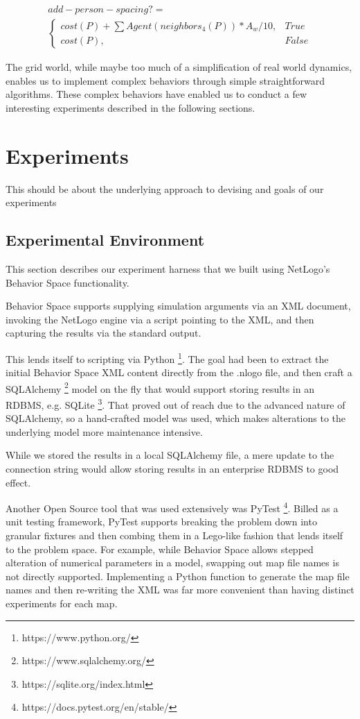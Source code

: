 \documentclass[12pt,letterpaper]{article}
\begin{document}
\begin{align}
add-person-spacing?= \nonumber  \\
\begin{cases}
	cost(P) + \sum Agent(neighbors_4(P)) * A_w / 10, & True \\
	cost(P), & False
\end{cases}
\end{align}

The grid world, while maybe too much of a simplification of real world dynamics, enables us to implement complex behaviors through simple straightforward algorithms.  These complex behaviors have enabled us to conduct a few interesting experiments described in the following sections.

\section{Experiments}

This should be about the underlying approach to devising and goals of our experiments

\subsection{Experimental Environment} \label{expEnv}
This section describes our experiment harness that we built using NetLogo's
Behavior Space functionality.

Behavior Space supports supplying simulation arguments via an XML document,
invoking the NetLogo engine via a script pointing to the XML, and then capturing
the results via the standard output.

This lends itself to scripting via Python \footnote{https://www.python.org/}. The goal had been to extract the
initial Behavior Space XML content directly from the .nlogo file, and then craft
a SQLAlchemy \footnote{https://www.sqlalchemy.org/} model on the fly that would support storing results in an RDBMS,
e.g. SQLite \footnote{https://sqlite.org/index.html}. That proved out of reach due to the advanced nature of SQLAlchemy,
so a hand-crafted model was used, which makes alterations to the underlying
model more maintenance intensive.

While we stored the results in a local SQLAlchemy file, a mere update to the
connection string would allow storing results in an enterprise RDBMS to good
effect.

Another Open Source tool that was used extensively was PyTest \footnote{https://docs.pytest.org/en/stable/}. Billed as a
unit testing framework, PyTest supports breaking the problem down into granular
fixtures and then combing them in a Lego-like fashion that lends itself to the
problem space. For example, while Behavior Space allows stepped alteration of
numerical parameters in a model, swapping out map file names is not directly
supported. Implementing a Python function to generate the map file names and
then re-writing the XML was far more convenient than having distinct
experiments for each map.
\end{document}
